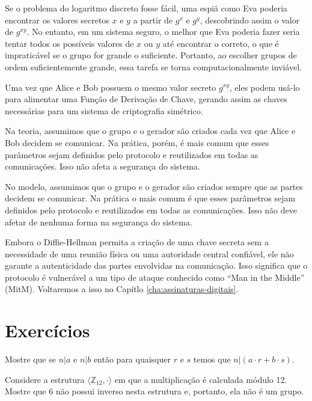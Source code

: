 Se o problema do logaritmo discreto fosse fácil, uma espiã como Eva poderia encontrar os valores secretos $x$ e $y$ a partir de $g^x$ e $g^y$, descobrindo assim o valor de $g^{xy}$.
No entanto, em um sistema seguro, o melhor que Eva poderia fazer seria tentar todos os possíveis valores de $x$ ou $y$ até encontrar o correto, o que é impraticável se o grupo for grande o suficiente.
Portanto, ao escolher grupos de ordem suficientemente grande, essa tarefa se torna computacionalmente inviável.

Uma vez que Alice e Bob possuem o mesmo valor secreto $g^{xy}$, eles podem usá-lo para alimentar uma Função de Derivação de Chave, gerando assim as chaves necessárias para um sistema de criptografia simétrico.

Na teoria, assumimos que o grupo e o gerador são criados cada vez que Alice e Bob decidem se comunicar.
Na prática, porém, é mais comum que esses parâmetros sejam definidos pelo protocolo e reutilizados em todas as comunicações.
Isso não afeta a segurança do sistema.


No modelo, assumimos que o grupo e o gerador são criados sempre que as partes decidem se comunicar.
Na prática o mais comum é que esses parâmetros sejam definidos pelo protocolo e reutilizados em todas as comunicações.
Isso não deve afetar de nenhuma forma na segurança do sistema.

Embora o Diffie-Hellman permita a criação de uma chave secreta sem a necessidade de uma reunião física ou uma autoridade central confiável, ele não garante a autenticidade das partes envolvidas na comunicação.
Isso significa que o protocolo é vulnerável a um tipo de ataque conhecido como ``Man in the Middle'' (MitM).
Voltaremos a isso no Capítlo \ref{cha:assinaturas-digitais}.

\section{Exercícios}

\begin{exercicio}
  Mostre que se $n|a$ e $n|b$ então para quaisquer $r$ e $s$ temos que $n|(a \cdot r + b \cdot s)$.
\end{exercicio}

\begin{exercicio}
\label{ex:grupo}
  Considere a estrutura $\langle \mathbb{Z}_{12}, \cdot \rangle$ em que a multiplicação é calculada módulo 12.
Mostre que $6$ não possui inverso nesta estrutura e, portanto, ela não é um grupo.
\end{exercicio}

